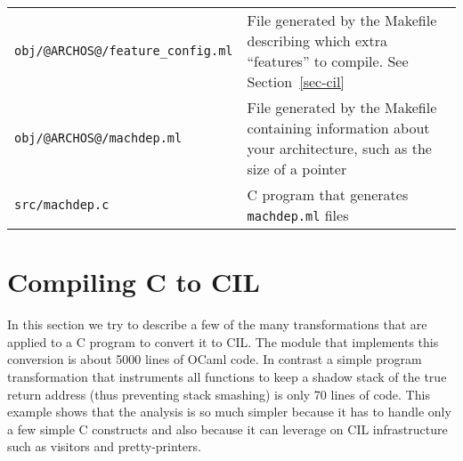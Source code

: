 \documentclass{article}
\def\secref#1{Section~\ref{sec-#1}}
\def\t#1{{\tt #1}}
\begin{document}
\begin{tabular}{ll}
\\
\t{obj/@ARCHOS@/feature\_config.ml}  & File generated by the Makefile
                                      describing which extra ``features''
                                      to compile. See \secref{cil} \\
\t{obj/@ARCHOS@/machdep.ml}     & File generated by the Makefile containing
                                  information about your architecture,
                                  such as the size of a pointer \\
\t{src/machdep.c}               & C program that generates
                                  \t{machdep.ml} files \\
\end{tabular}


\section{Compiling C to CIL}\label{sec-cabs2cil}

 In this section we try to describe a few of the many transformations that are
applied to a C program to convert it to CIL. The module that implements this
conversion is about 5000 lines of OCaml code. In contrast a simple program
transformation that instruments all functions to keep a shadow stack of the
true return address (thus preventing stack smashing) is only 70 lines of code.
This example shows that the analysis is so much simpler because it has to
handle only a few simple C constructs and also because it can leverage on CIL
infrastructure such as visitors and pretty-printers.
\end{document}
